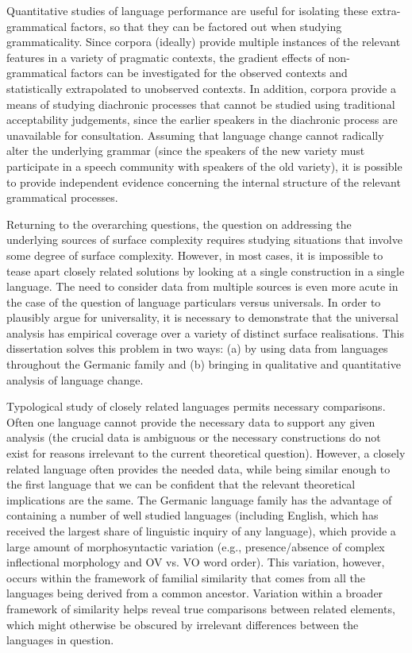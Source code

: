 Quantitative studies of language performance are useful for isolating these extra-grammatical factors, so that they can be factored out when studying grammaticality. Since corpora (ideally) provide multiple instances of the relevant features in a variety of pragmatic contexts, the gradient effects of non-grammatical factors can be investigated for the observed contexts and statistically extrapolated to unobserved contexts. In addition, corpora provide a means of studying diachronic processes that cannot be studied using traditional acceptability judgements, since the earlier speakers in the diachronic process are unavailable for consultation. Assuming that language change cannot radically alter the underlying grammar (since the speakers of the new variety must participate in a speech community with speakers of the old variety), it is possible to provide independent evidence concerning the internal structure of the relevant grammatical processes. 

Returning to the overarching questions, the question on addressing the underlying sources of surface complexity requires studying situations that involve some degree of surface complexity. However, in most cases, it is impossible to tease apart closely related solutions by looking at a single construction in a single language. The need to consider data from multiple sources is even more acute in the case of the question of language particulars versus universals. In order to plausibly argue for universality, it is necessary to demonstrate that the universal analysis has empirical coverage over a variety of distinct surface realisations. This dissertation solves this problem in two ways: (a) by using data from languages throughout the Germanic family and (b) bringing in qualitative and quantitative analysis of language change.

Typological study of closely related languages permits necessary comparisons. Often one language cannot provide the necessary data to support any given analysis (the crucial data is ambiguous or the necessary constructions do not exist for reasons irrelevant to the current theoretical question). However, a closely related language often provides the needed data, while being similar enough to the first language that we can be confident that the relevant theoretical implications are the same. The Germanic language family has the advantage of containing a number of well studied languages (including English, which has received the largest share of linguistic inquiry of any language), which provide a large amount of morphosyntactic variation (e.g., presence/absence of complex inflectional morphology and OV vs. VO word order). This variation, however, occurs within the framework of familial similarity that comes from all the languages being derived from a common ancestor. Variation within a broader framework of similarity helps reveal true comparisons between related elements, which might otherwise be obscured by irrelevant differences between the languages in question.

